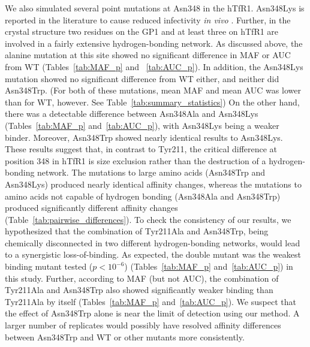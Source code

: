 \documentclass[12pt]{article}
\begin{document}
We also simulated several point mutations at Asn348 in the hTfR1. Asn348Lys is reported in the literature to cause reduced infectivity \textit{in vivo} \citep{Rad2008,Abraham2010}. Further, in the crystal structure two residues on the GP1 and at least three on hTfR1 are involved in a fairly extensive hydrogen-bonding network. As discussed above, the alanine mutation at this site showed no significant difference in MAF or AUC from WT (Tables~\ref{tab:MAF_p} and ~\ref{tab:AUC_p}). In addition, the Asn348Lys mutation showed no significant difference from WT either, and neither did Asn348Trp. (For both of these mutations, mean MAF and mean AUC was lower than for WT, however. See Table~\ref{tab:summary_statistics})  On the other hand, there was a detectable difference between Asn348Ala and Asn348Lys (Tables~\ref{tab:MAF_p} and~\ref{tab:AUC_p}), with Asn348Lys being a weaker binder. Moreover, Asn348Trp showed nearly identical results to Asn348Lys. These results suggest that, in contrast to Tyr211, the critical difference at position 348 in hTfR1 is size exclusion rather than the destruction of a hydrogen-bonding network. The mutations to large amino acids (Asn348Trp and Asn348Lys) produced nearly identical affinity changes, whereas the mutations to amino acids not capable of hydrogen bonding (Asn348Ala and Asn348Trp) produced significantly different affinity changes (Table~\ref{tab:pairwise_differences}). To check the consistency of our results, we hypothesized that the combination of Tyr211Ala and Asn348Trp, being chemically disconnected in two different hydrogen-bonding networks, would lead to a synergistic loss-of-binding. As expected, the double mutant was the weakest binding mutant tested ($ p < 10^{-6} $) (Tables~\ref{tab:MAF_p} and~\ref{tab:AUC_p}) in this study. Further, according to MAF (but not AUC), the combination of Tyr211Ala and Asn348Trp also showed significantly weaker binding than Tyr211Ala by itself (Tables~\ref{tab:MAF_p} and~\ref{tab:AUC_p}). We suspect that the effect of Asn348Trp alone is near the limit of detection using our method. A larger number of replicates would possibly have resolved affinity differences between Asn348Trp and WT or other mutants more consistently.
\end{document}
